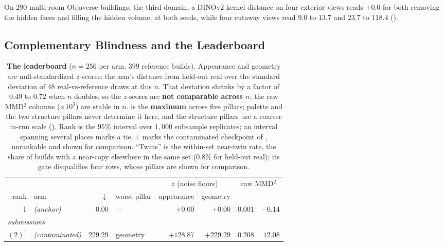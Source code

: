 On $290$ multi-room Objaverse buildings, the third domain, a DINOv2 kernel distance on four
exterior views reads $+0.0$ for both removing the hidden faces and filling the hidden volume,
at both seeds, while four cutaway views read $9.0$ to $13.7$ and \vkid{} $23.7$ to $118.4$
().

\subsection{Complementary Blindness and the Leaderboard}
\label{sec:complementary}

\begin{table}[t]
\centering
\small
\setlength{\tabcolsep}{3pt}
\caption{\textbf{The leaderboard} ($n{=}256$ per arm, $399$ reference builds). Appearance
and geometry are null-standardized $z$-scores: the arm's distance from held-out real over
the standard deviation of $48$ real-vs-reference draws at this $n$. That deviation shrinks by
a factor of $0.49$ to $0.72$ when $n$ doubles, so the $z$-scores are \textbf{not comparable across $n$}; the raw
MMD$^2$ columns ($\times 10^3$) are stable in $n$. \blockscore{} is the
\textbf{maximum} across five pillars; palette and the two structure pillars never determine
it here, and the structure pillars use a coarser in-run scale (). Rank is the $95\%$ interval over $1{,}000$ subsample
replicates; an interval spanning several places marks a tie. $\dagger$~marks the contaminated
checkpoint of , unrankable and shown for comparison. ``Twins'' is
the within-set near-twin rate, the share of builds with a near-copy elsewhere in the same
set ($0.8\%$ for held-out real); its gate disqualifies four rows, whose pillars are shown
for comparison.}
\label{tab:leaderboard}
\begin{tabular}{rlrlrrrr}
\toprule
& & & & \multicolumn{2}{c}{$z$ (noise floors)} & \multicolumn{2}{c}{raw MMD$^2$} \\
\cmidrule(lr){5-6}\cmidrule(lr){7-8}
rank & arm & \blockscore{}~$\downarrow$ & worst pillar & appearance & geometry & \mvkid{} & \vkid{} \\
\midrule
1 & \realheld{} \emph{(anchor)}      & $0.00$   & ---        & $+0.00$   & $+0.00$ & $0.001$ & $-0.14$ \\
\midrule
\multicolumn{8}{l}{\emph{submissions}} \\
$(2)^\dagger$ & \voxar{} \emph{(contaminated)} & $229.29$ & geometry & $+128.87$ & $+229.29$ & $0.208$ & $12.08$ \\

\end{tabular}
\end{table}
